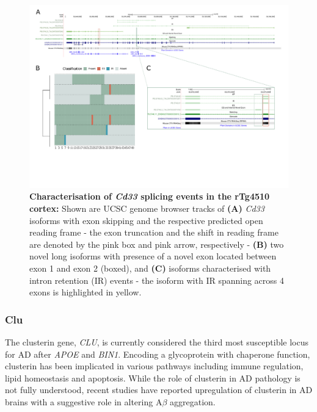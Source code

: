 \begin{landscape}
	\begin{figure}[htp]
		\centering
		\captionsetup{width=1.3\textwidth}
		\includegraphics[page=5,trim={0 3.5cm 0 0},scale = 0.85]{Figures/TargetGenes_Annotation_Landscape.pdf}
		\caption[Characterisation of \textit{Cd33} splicing events in the rTg4510 cortex]%
		{\textbf{Characterisation of \textit{Cd33} splicing events in the rTg4510 cortex:} Shown are UCSC genome browser tracks of \textbf{(A)} \textit{Cd33} isoforms with exon skipping and the respective predicted open reading frame - the exon truncation and the shift in reading frame are denoted by the pink box and pink arrow, respectively - \textbf{(B)} two novel long isoforms with presence of a novel exon located between exon 1 and exon 2 (boxed), and \textbf{(C)} isoforms characterised with intron retention (IR) events - the isoform with IR spanning across 4 exons is highlighted in yellow.}    
		\label{fig:cd33_orf}
	\end{figure}
\end{landscape}
\restoregeometry 

\newpage
\subsubsection{Clu}
The clusterin gene, \textit{CLU}, is currently considered the third most susceptible locus for AD after \textit{APOE} and \textit{BIN1}\cite{Lambert2019}. Encoding a glycoprotein with chaperone function, clusterin has been implicated in various pathways including immune regulation, lipid homeostasis and apoptosis\cite{Foster2019}. While the role of clusterin in AD pathology is not fully understood, recent studies have reported upregulation of clusterin in AD brains with a suggestive role in altering A$\beta$ aggregation\cite{Jackson2019}. 

